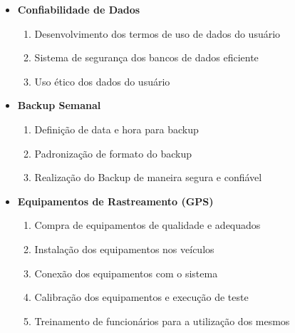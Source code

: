 \begin{itemize}
	\item \textbf{Confiabilidade de Dados} \begin{enumerate}
		\item Desenvolvimento dos termos de uso de dados do usuário
		\item Sistema de segurança dos bancos de dados eficiente
		\item Uso ético dos dados do usuário 
	\end{enumerate}

	\item \textbf{Backup Semanal} \begin{enumerate}
		\item Definição de data e hora para backup
		\item Padronização de formato do backup
		\item Realização do Backup de maneira segura e confiável
	\end{enumerate}

	\item \textbf{Equipamentos de Rastreamento (GPS)} \begin{enumerate}
			\item Compra de equipamentos de qualidade e adequados
			\item Instalação dos equipamentos nos veículos
			\item Conexão dos equipamentos com o sistema
			\item Calibração dos equipamentos e execução de teste
			\item Treinamento de funcionários para a utilização dos mesmos
		\end{enumerate}
\end{itemize}	

